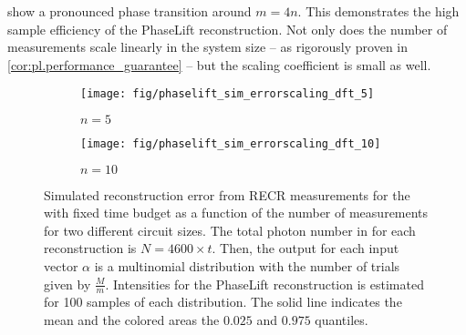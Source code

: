  show a pronounced phase transition around $m = 4n$.
This demonstrates the high sample efficiency of the PhaseLift reconstruction.
Not only does the number of measurements scale linearly in the system size -- as rigorously proven in \cref{cor:pl.performance_guarantee} -- but the scaling coefficient is small as well.\\

\begin{figure*}[t]
  \begin{subfigure}{.475\columnwidth}
    \texttt{[image: fig/phaselift\_sim\_errorscaling\_dft\_5]}
    \caption{\label{sfig:pl.simerror.five}%
      $n = 5$
    }
   \end{subfigure}
  \begin{subfigure}{.475\columnwidth}
    \texttt{[image: fig/phaselift\_sim\_errorscaling\_dft\_10]}
    \caption{\label{sfig:pl.simerror.ten}%
      $n = 10$
    }
   \end{subfigure}
  \caption{\label{fig:pl.simerror}%
    Simulated reconstruction error from RECR measurements for the with fixed time budget as a function of the number of measurements for two different circuit sizes.
    The total photon number in for each reconstruction is $N = 4600 \times t$.
    Then, the output for each input vector $\alpha$ is a multinomial distribution with the number of trials given by $\frac{M}{m}$.
    Intensities for the PhaseLift reconstruction is estimated for 100 samples of each distribution.
    The solid line indicates the mean and the colored areas the $0.025$ and $0.975$ quantiles.
  }
\end{figure*}


